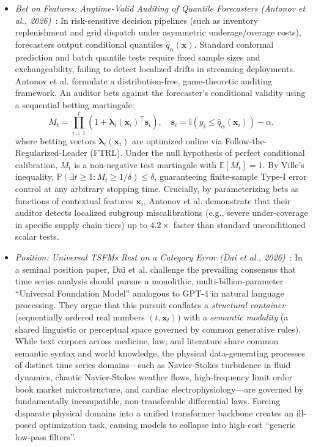 \begin{itemize}[leftmargin=*]
    \item \emph{Bet on Features: Anytime-Valid Auditing of Quantile Forecasters (Antonov et al., 2026)}~\cite{antonov2026betonfeatures}: In risk-sensitive decision pipelines (such as inventory replenishment and grid dispatch under asymmetric underage/overage costs), forecasters output conditional quantiles $\hat{q}_\alpha(\mathbf{x})$. Standard conformal prediction and batch quantile tests require fixed sample sizes and exchangeability, failing to detect localized drifts in streaming deployments. Antonov et al. formulate a distribution-free, game-theoretic auditing framework. An auditor bets against the forecaster's conditional validity using a sequential betting martingale:
    \begin{equation}
        M_t = \prod_{i=1}^t \left(1 + \boldsymbol{\lambda}_i(\mathbf{x}_i)^\top \mathbf{s}_i\right), \quad \mathbf{s}_i = \mathbb{I}\left(y_i \le \hat{q}_\alpha(\mathbf{x}_i)\right) - \alpha,
    \end{equation}
    where betting vectors $\boldsymbol{\lambda}_i(\mathbf{x}_i)$ are optimized online via Follow-the-Regularized-Leader (FTRL). Under the null hypothesis of perfect conditional calibration, $M_t$ is a non-negative test martingale with $\mathbb{E}[M_t] = 1$. By Ville's inequality, $\mathbb{P}(\exists t \ge 1: M_t \ge 1/\delta) \le \delta$, guaranteeing finite-sample Type-I error control at any arbitrary stopping time. Crucially, by parameterizing bets as functions of contextual features $\mathbf{x}_i$, Antonov et al. demonstrate that their auditor detects localized subgroup miscalibrations (e.g., severe under-coverage in specific supply chain tiers) up to $4.2\times$ faster than standard unconditioned scalar tests.

    \item \emph{Position: Universal TSFMs Rest on a Category Error (Dai et al., 2026)}~\cite{dai2026categoryerror}: In a seminal position paper, Dai et al. challenge the prevailing consensus that time series analysis should pursue a monolithic, multi-billion-parameter ``Universal Foundation Model'' analogous to GPT-4 in natural language processing. They argue that this pursuit conflates a \emph{structural container} (sequentially ordered real numbers $(t, \mathbf{x}_t)$) with a \emph{semantic modality} (a shared linguistic or perceptual space governed by common generative rules). While text corpora across medicine, law, and literature share common semantic syntax and world knowledge, the physical data-generating processes of distinct time series domains—such as Navier-Stokes turbulence in fluid dynamics, chaotic Navier-Stokes weather flows, high-frequency limit order book market microstructure, and cardiac electrophysiology—are governed by fundamentally incompatible, non-transferable differential laws. Forcing disparate physical domains into a unified transformer backbone creates an ill-posed optimization task, causing models to collapse into high-cost ``generic low-pass filters''.
    

\end{itemize}
